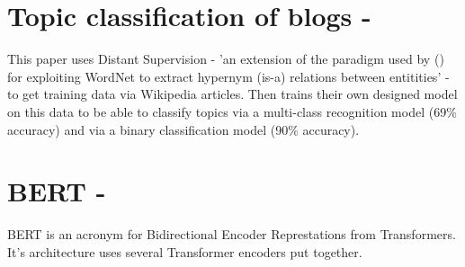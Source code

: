 \section{Topic classification of blogs - \cite{husby2012topic}}
This paper uses Distant Supervision - 'an extension of the paradigm used by (\cite{snow}) for exploiting WordNet to extract hypernym (is-a) relations between entitities'
- to get training data via Wikipedia articles. Then trains their own designed model on this data to be able to classify topics via a
multi-class recognition model (69\% accuracy) and via a binary classification model (90\% accuracy).

\section{BERT - \cite{BERT}}
BERT is an acronym for Bidirectional Encoder Represtations from Transformers. It's architecture uses several Transformer encoders
put together.